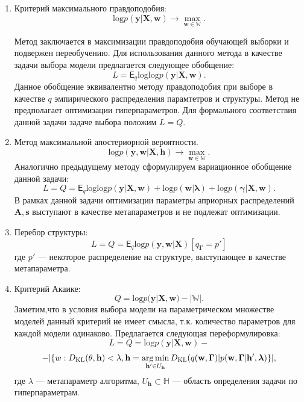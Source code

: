 \begin{enumerate}
\item Критерий максимального правдоподобия:
\[
    \text{log}p(\mathbf{y}|\mathbf{X}, \mathbf{w}) \to \max_{\mathbf{w} \in \mathbb{W}}.
\]

Метод заключается в максимизации правдоподобия обучающей выборки и подвержен переобучению.
Для использования данного метода в качестве задачи выбора модели предлагается следующее обобщение:
\begin{equation}
\label{eq:optim_ml}
    L =  \mathsf{E}_q \text{log} \text{log}p(\mathbf{y}|\mathbf{X}, \mathbf{w}).
\end{equation}
Данное обобщение эквивалентно  методу правдоподобия при выборе в качестве $q$ эмпирического распределения парамтетров и структуры.
Метод не предполагает оптимизации гиперпараметров. Для формального соответствия данной задачи задаче выбора положим $L=Q$.


\item Метод максимальной апостериорной вероятности. 
\[
    \text{log}p(\mathbf{y},\mathbf{w}|\mathbf{X}, \mathbf{h} ) \to \max_{\mathbf{w} \in \mathbb{W}}.
\]
Аналогично предыдущему методу сформулируем вариационное обобщение данной задачи:
\begin{equation}
\label{eq:optim_map}
    L = Q = \mathsf{E}_q \text{log} \text{log}p(\mathbf{y}|\mathbf{X}, \mathbf{w})+\text{log}p(\mathbf{w}|\boldsymbol{\lambda}) + \text{log}p(\boldsymbol{\gamma}|\mathbf{X}, \mathbf{w}).
\end{equation}
В рамках данной задачи оптимизации параметры априорных распределений $\mathbf{A}, \mathbf{s}$ выступают в качестве метапараметров и не подлежат оптимизации.



\item Перебор структуры:
\begin{equation}
\label{eq:optim_struct}
    L =  Q = \mathsf{E}_q\text{log}p(\mathbf{y}, \mathbf{w}|\mathbf{X})[q_{\boldsymbol{\Gamma}} = p']
\end{equation}
где $p'$ --- некоторое распределение на структуре, выступающее в качестве метапараметра.




\item Критерий Акаике:
\[
   Q =  \text{log}p(\mathbf{y}|\mathbf{X}, \mathbf{w}) - |\mathbb{W}|.
\]
Заметим,что в условия выбора модели на параметрическом множестве моделей данный критерий не имеет смысла, т.к. количество параметров для каждой модели одинаково. Предлагается следующая переформулировка:
\begin{equation}
\label{eq:optim_aic}
    L = Q = \text{log}p(\mathbf{y}|\mathbf{X}, \mathbf{w}) - 
\end{equation}
\[
-|\{w: D_\text{KL}(\theta, \mathbf{h})<\lambda, \mathbf{h} = \operatorname*{arg\,min}_{\mathbf{h}' \in U_\mathbf{h}} D_\text{KL}(q(\mathbf{w}, \boldsymbol{\Gamma}) | p(\mathbf{w}, \boldsymbol{\Gamma}|\mathbf{h}',\boldsymbol{\lambda})\}|,
\]
где $\lambda$ --- метапараметр алгоритма, $U_\mathbf{h}  \subset \mathbb{H}$ --- область определения задачи по гиперпараметрам.


\end{enumerate}
